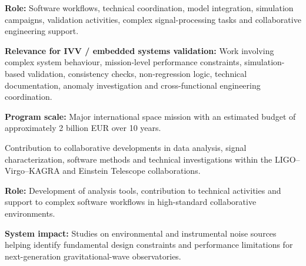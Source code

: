 \documentclass[8pt,a4paper,ragged2e,withhyper]{../_shared/altacv}
\begin{document}
\textbf{Role:} Software workflows, technical coordination, model integration, simulation campaigns, validation activities, complex signal-processing tasks and collaborative engineering support.

\textbf{Relevance for IVV / embedded systems validation:} Work involving complex system behaviour, mission-level performance constraints, simulation-based validation, consistency checks, non-regression logic, technical documentation, anomaly investigation and cross-functional engineering coordination.

\textbf{Program scale:} Major international space mission with an estimated budget of approximately 2 billion EUR over 10 years.

\divider


Contribution to collaborative developments in data analysis, signal characterization, software methods and technical investigations within the LIGO--Virgo--KAGRA and Einstein Telescope collaborations.

\textbf{Role:} Development of analysis tools, contribution to technical activities and support to complex software workflows in high-standard collaborative environments.

\textbf{System impact:} Studies on environmental and instrumental noise sources helping identify fundamental design constraints and performance limitations for next-generation gravitational-wave observatories.
\newpage


\vspace{-.3cm}


{\small
{}
\newline
{}
}

\divider\smallskip
\vspace{-.3cm}

\end{document}

